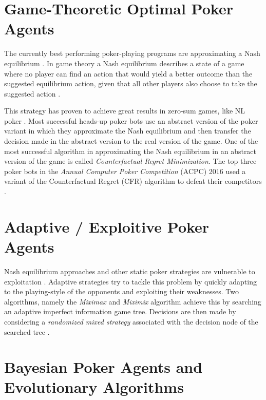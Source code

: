 \section{Game-Theoretic Optimal Poker Agents}
The currently best performing poker-playing programs are approximating a Nash equilibrium \cite{quality_of_bots}.
In game theory a Nash equilibrium describes a state of a game where no player can find an action that would yield a better outcome than the suggested equilibrium action, given that all other players also choose to take the suggested action \cite{game_theory}. \par
This strategy has proven to achieve great results in zero-sum games, like NL  poker \cite{master_nuno}. Most successful heads-up poker bots use an abstract version of the poker variant in which they approximate the Nash equilibrium and then transfer the decision made in the abstract version to the real version of the game. One of the most successful algorithm in approximating the Nash equilibrium in an abstract version of the game is called \textit{Counterfactual Regret Minimization}. The top three poker bots in the \textit{Annual Computer Poker Competition} (ACPC) 2016 used a variant of the Counterfactual Regret (CFR) algorithm to defeat their competitors \cite{quality_of_bots}.
\section{Adaptive / Exploitive Poker Agents}
Nash equilibrium approaches and other static poker strategies are vulnerable to exploitation \cite{master_nuno}.
Adaptive strategies try to tackle this problem by quickly adapting to the playing-style of the opponents and exploiting their weaknesses. Two algorithms, namely the \textit{Miximax} and \textit{Miximix} algorithm achieve this by searching an adaptive imperfect information game tree. Decisions are then made by considering a \textit{randomized mixed strategy} associated with the decision node of the searched tree \cite{billings_phd}.
\section{Bayesian Poker Agents and Evolutionary Algorithms}
